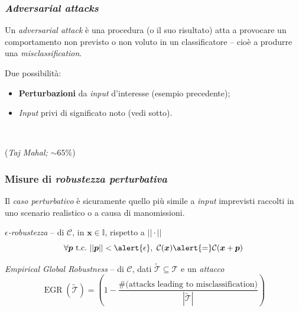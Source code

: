 \documentclass{beamer}
\DeclareMathOperator*{\EGR}{EGR}
\begin{document}
{%

\begin{frame}
	\frametitle{\textit{Adversarial attacks}}
	Un \textit{adversarial attack} è una procedura (o il suo risultato) atta a provocare un comportamento \alert{non previsto} o \alert{non voluto} in un classificatore -- cioè a produrre una \textit{misclassification}.

	\hfill\break

	Due possibilità:

	\begin{itemize}
	\item{\textbf{Perturbazioni} da \textit{input} d'interesse (esempio precedente);}
	\item{\textit{Input} privi di significato noto (vedi sotto).}
	\end{itemize}

	\\
	{\raggedleft(\textit{Taj Mahal; $\sim 65\%$})\par}

\end{frame}


\begin{frame}
	\frametitle{Misure di \textit{robustezza perturbativa}}
	Il \textit{caso perturbativo} è sicuramente quello più simile a \textit{input} imprevisti raccolti in uno scenario realistico o a causa di manomissioni.
	\hfill\break

	\begin{block}{\textit{$\epsilon$-robustezza} -- di $\mathcal{C}$, in $\boldsymbol{x} \in \mathbb{I}$, rispetto a $||\cdot||$}
		$$
		\forall \boldsymbol{p} \ \text{t.c.} \ ||\boldsymbol{p}|| < \alert{\epsilon}, \ \mathcal{C}(\boldsymbol{x}) \alert{=} \mathcal{C}(\boldsymbol{x} +\boldsymbol{p} )
		$$
	\end{block}

	\begin{block}{\textit{Empirical Global Robustness} -- di $\mathcal{C}$, dati $\mathcal{\tilde{T}} \subseteq \mathcal{T}$ e un \textit{attacco}}
		$$\EGR({\tilde{\mathcal{T}}}) = \left( 1 - \frac{\# \text{(attacks leading to misclassification)}}{|\mathcal{\tilde{T}}|} \right)$$
	\end{block}


\end{frame}}
\end{document}
